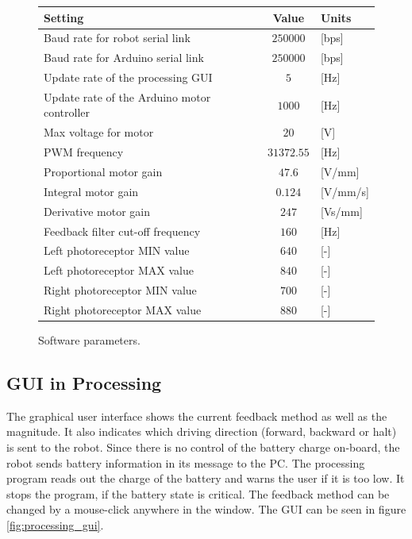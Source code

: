 \begin{figure}[h!]
	\centering
	\begin{tabular}{|l|c|l|}
			
		\hline
		Setting & Value & Units \\ \hline \hline
		Baud rate for robot serial link & $250000$ & [bps]\\ \hline
		Baud rate for Arduino serial link & $250000$ & [bps] \\ \hline
		Update rate of the processing GUI & $5$ & [Hz] \\ \hline
		Update rate of the Arduino motor controller & $1000$ & [Hz] \\ \hline
		Max voltage for motor & $20$ & [V] \\ \hline
		PWM frequency & $31372.55$ & [Hz]  \\ \hline
		Proportional motor gain & $47.6$  & [V/mm] \\ \hline
		Integral motor gain & $0.124$  & [V/mm/s]\\ \hline
		Derivative motor gain & $247$  & [Vs/mm]\\ \hline
		Feedback filter cut-off frequency  & $160$ & [Hz] \\ \hline %
		Left photoreceptor MIN value & $640$ & [-] \\ \hline
		Left photoreceptor MAX value & $840$ & [-] \\ \hline
		Right photoreceptor MIN value & $700$ & [-] \\ \hline
		Right photoreceptor MAX value & $880$ & [-] \\ \hline		
	\end{tabular}
	\caption{Software parameters.}
	\label{tab:programming_params}
\end{figure}
	
	

\subsection{GUI in Processing}
The graphical user interface shows the current feedback method as well as the magnitude. It also indicates which driving direction (forward, backward or halt) is sent to the robot. Since there is no control of the battery charge on-board, the robot sends battery information in its message to the PC. The processing program reads out the charge of the battery and warns the user if it is too low. It stops the program, if the battery state is critical. The feedback method can be changed by a mouse-click anywhere in the window. The GUI can be seen in figure \ref{fig:processing_gui}.
	 
